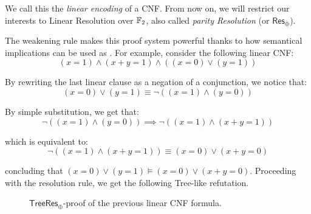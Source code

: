 We call this the \textit{linear encoding} of a CNF. From now on, we will restrict our interests to Linear Resolution over $\mathbb{F}_2$, also called \textit{parity Resolution} (or $\mathsf{Res}_\oplus$).

The weakening rule makes this proof system powerful thanks to how semantical implications can be used as . For example, consider the following linear CNF:
\[(x = 1) \land (x+y = 1) \land ((x = 0) \lor (y = 1))\]

\noindent
By rewriting the last linear clause as a negation of a conjunction, we notice that:
\[(x = 0) \lor (y = 1) \equiv \lnot ((x = 1) \land (y = 0))\]

\noindent
By simple substitution, we get that:
\[\lnot ((x = 1) \land (y = 0)) \implies  \lnot ((x = 1) \land (x+y = 1))\]

\noindent
which is equivalent to:
\[\lnot ((x = 1) \land (x+y = 1)) \equiv (x = 0) \lor (x+y = 0)\]

\noindent
concluding that $(x = 0) \lor (y = 1) \models (x = 0) \lor (x+y = 0)$. Proceeding with the resolution rule, we get the following Tree-like refutation.
\begin{figure}[H]
    \centering
    

    \caption{$\mathsf{TreeRes}_\oplus$-proof of the previous linear CNF formula.}
    \label{treelike_proof}
\end{figure}

